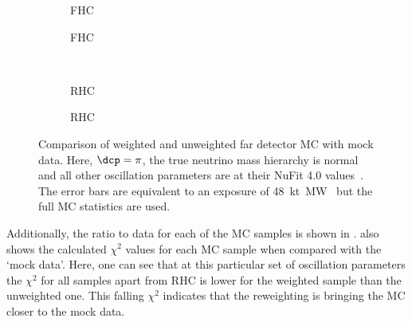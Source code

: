 \begin{figure}[h]
	\begin{subfigure}[t]{.5\linewidth}
		\begin{adjustbox}{max totalsize=\linewidth, center}
			
		\end{adjustbox}
		\caption{FHC \numu}
	\end{subfigure}
	\hfill
	\begin{subfigure}[t]{.5\linewidth}
		\begin{adjustbox}{max totalsize=\linewidth, center}
			
		\end{adjustbox}
		\caption{FHC \nue}
	\end{subfigure} \\
	\begin{subfigure}[t]{.5\linewidth}
		\begin{adjustbox}{max totalsize=\linewidth, center}
			
		\end{adjustbox}
		\caption{RHC \anumu}
	\end{subfigure}
	\hfill
	\begin{subfigure}[t]{.5\linewidth}
		\begin{adjustbox}{max totalsize=\linewidth, center}
			
		\end{adjustbox}
		\caption{RHC \anue}
	\end{subfigure}
	\caption[Comparison of weighted and unweighted far detector MC with mock data.]{Comparison of weighted and unweighted far detector MC with mock data. Here, $\dcp=\pi$, the true neutrino mass hierarchy is normal and all other oscillation parameters are at their NuFit 4.0 values~\cite{nufit4}. The error bars are equivalent to an exposure of \SI{48}{\kilo\tonne\mega\watt\year} but the full MC statistics are used.}
	\label{fig:reweightedSamples}
\end{figure}

Additionally, the ratio to data for each of the MC samples is shown in .
 also shows the calculated $\chi^{2}$ values for each MC sample when compared with the `mock data'.
Here, one can see that at this particular set of oscillation parameters the $\chi^{2}$ for all samples apart from \nue RHC is lower for the weighted sample than the unweighted one.
This falling $\chi^{2}$ indicates that the reweighting is bringing the MC closer to the mock data.


